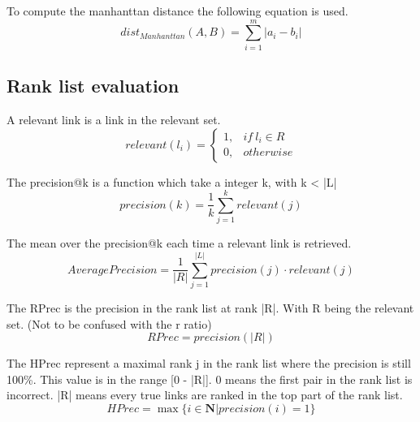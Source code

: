 \begin{definition}
  To compute the manhanttan distance the following equation is used.
  \begin{equation}
    dist_{Manhanttan}(A, B) = \sum_{i=1}^{m} |a_i - b_i|
  \end{equation}
\end{definition}

\subsection{Rank list evaluation}

\begin{definition}
  A relevant link is a link in the relevant set.
  \begin{equation}
    relevant(l_i) =
    \begin{cases}
      1, & if\ l_i \in R \\
      0, & otherwise
    \end{cases}
  \end{equation}
\end{definition}

\begin{definition}
  The precision@k is a function which take a integer k, with k < |L|
  \begin{equation}
    precision(k) = \frac{1}{k} \sum_{j=1}^{k} relevant(j)
  \end{equation}
\end{definition}

\begin{definition}
  The mean over the precision@k each time a relevant link is retrieved.
  \begin{equation}
    AveragePrecision = \frac{1}{|R|} \sum_{j=1}^{|L|} precision(j) \cdot relevant(j)
  \end{equation}
\end{definition}

\begin{definition}
  The RPrec is the precision in the rank list at rank |R|.
  With R being the relevant set. (Not to be confused with the r ratio)
  \begin{equation}
    RPrec = precision(|R|)
  \end{equation}
\end{definition}

\begin{definition}
  The HPrec represent a maximal rank j in the rank list where the precision is still 100\%.
  This value is in the range [0 - |R|].
  0 means the first pair in the rank list is incorrect.
  |R| means every true links are ranked in the top part of the rank list.
  \begin{equation}
    HPrec = \max\{i \in \mathbf{N} | precision(i) = 1\}
  \end{equation}
\end{definition}


